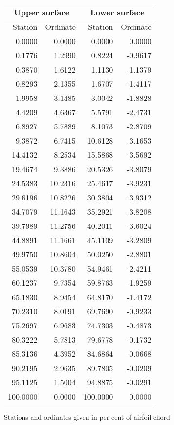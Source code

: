 \documentclass[11pt]{book}
\begin{document}
 \hspace{4mm}
 \begin{tabular}{|r|r|r|r|} \hline 
 \multicolumn{2}{|c|}{Upper surface} & \multicolumn{2}{|c|}{Lower surface} \\
 \hline
 Station & Ordinate & Station & Ordinate \\
 \hline
0.0000 & 0.0000 & 0.0000 & 0.0000 \\
0.1776 & 1.2990 & 0.8224 & -0.9617 \\
0.3870 & 1.6122 & 1.1130 & -1.1379 \\
0.8293 & 2.1355 & 1.6707 & -1.4117 \\
1.9958 & 3.1485 & 3.0042 & -1.8828 \\
4.4209 & 4.6367 & 5.5791 & -2.4731 \\
6.8927 & 5.7889 & 8.1073 & -2.8709 \\
9.3872 & 6.7415 & 10.6128 & -3.1653 \\
14.4132 & 8.2534 & 15.5868 & -3.5692 \\
19.4674 & 9.3886 & 20.5326 & -3.8079 \\
24.5383 & 10.2316 & 25.4617 & -3.9231 \\
29.6196 & 10.8226 & 30.3804 & -3.9312 \\
34.7079 & 11.1643 & 35.2921 & -3.8208 \\
39.7989 & 11.2756 & 40.2011 & -3.6024 \\
44.8891 & 11.1661 & 45.1109 & -3.2809 \\
49.9750 & 10.8604 & 50.0250 & -2.8801 \\
55.0539 & 10.3780 & 54.9461 & -2.4211 \\
60.1237 & 9.7354 & 59.8763 & -1.9259 \\
65.1830 & 8.9454 & 64.8170 & -1.4172 \\
70.2310 & 8.0191 & 69.7690 & -0.9233 \\
75.2697 & 6.9683 & 74.7303 & -0.4873 \\
80.3222 & 5.7813 & 79.6778 & -0.1732 \\
85.3136 & 4.3952 & 84.6864 & -0.0668 \\
90.2195 & 2.9635 & 89.7805 & -0.0209 \\
95.1125 & 1.5004 & 94.8875 & -0.0291 \\
100.0000 & -0.0000 & 100.0000 & 0.0000 \\
 \hline 
 \end{tabular}
 \vspace{8mm}

Stations and ordinates given in per cent of airfoil chord
\end{document}
